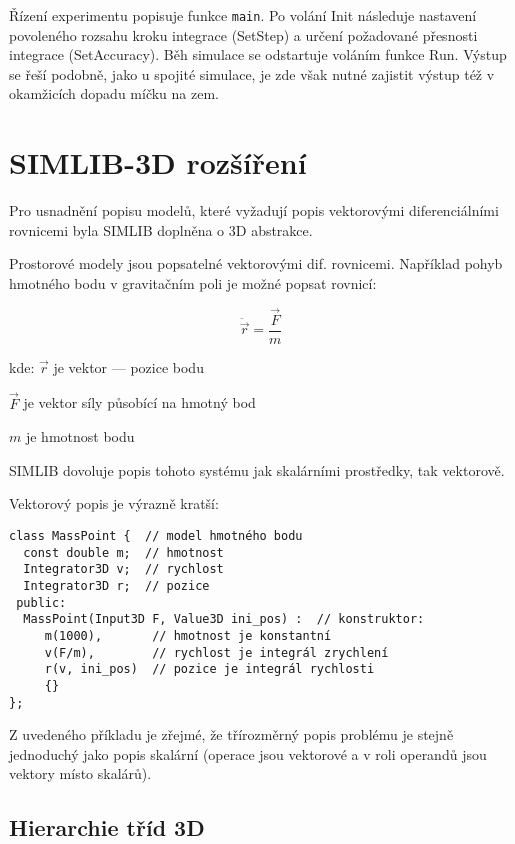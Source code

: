 \documentclass[a4paper]{article}
\begin{document}
Řízení experimentu popisuje funkce \verb|main|. Po volání Init
následuje nastavení povoleného rozsahu kroku integrace (SetStep)
a určení požadované přesnosti integrace (SetAccuracy). Běh
simulace se odstartuje voláním funkce Run. Výstup se řeší
podobně, jako u spojité simulace, je zde však nutné zajistit
výstup též v okamžicích dopadu míčku na zem.



\section{SIMLIB-3D rozšíření}

Pro usnadnění popisu modelů, které vyžadují popis vektorovými diferenciálními
rovnicemi byla SIMLIB doplněna o 3D abstrakce.

Prostorové modely jsou popsatelné vektorovými dif. rovnicemi. Například pohyb
hmotného bodu v gravitačním poli je možné popsat rovnicí:

   $$ \ddot{\vec{r}} = \frac{\vec{F}}{m} $$

kde:
   $\vec{r}$ je vektor --- pozice bodu

   $\vec{F}$ je vektor síly působící na hmotný bod

   $m$ je hmotnost bodu

SIMLIB dovoluje popis tohoto systému jak skalárními prostředky, tak vektorově.

Vektorový popis je výrazně kratší:

{
\small
\begin{verbatim}
class MassPoint {  // model hmotného bodu
  const double m;  // hmotnost
  Integrator3D v;  // rychlost
  Integrator3D r;  // pozice
 public:
  MassPoint(Input3D F, Value3D ini_pos) :  // konstruktor:
     m(1000),       // hmotnost je konstantní
     v(F/m),        // rychlost je integrál zrychlení
     r(v, ini_pos)  // pozice je integrál rychlosti
     {}
};
\end{verbatim}
}

Z uvedeného příkladu je zřejmé, že třírozměrný popis problému je stejně
jednoduchý jako popis skalární (operace jsou vektorové a v roli operandů jsou
vektory místo skalárů).



\subsection{Hierarchie tříd 3D}
\end{document}
